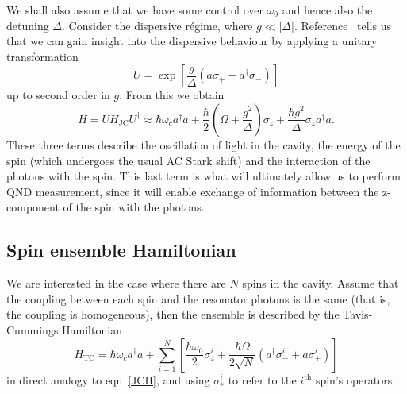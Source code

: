 \documentclass{article}
\begin{document}
We shall also assume that we have some control over $\omega_0$ and hence also
the detuning $\Delta$. Consider the dispersive r\'egime, where  $g\ll|\Delta|$.
Reference~\cite{PhysRevA.69.062320} tells us that we can gain insight into the
dispersive behaviour by applying  a unitary transformation
%
\begin{equation} U = \exp \left[\frac{g}{\Delta}(a\sigma_+ -
a^\dagger\sigma_-)\right] \end{equation}
%
up to second order in $g$.
From this we obtain
%
\begin{equation} H= UH_\text{JC}U^\dagger \approx \hbar \omega_c
  a^\dagger a + \frac{\hbar}{2}\left(\Omega +
  \frac{g^2}{\Delta}\right)\sigma_z + \frac{\hbar
  g^2}{\Delta}\sigma_z a^\dagger a.  \end{equation}
%
These three terms describe the oscillation of light in the cavity, the energy
of the spin (which undergoes the usual AC Stark shift) and the interaction of
the photons with the spin. This last term is what will ultimately allow us to
perform QND measurement, since it will enable exchange of information between
the z-component of the spin with the photons.

\subsection{Spin ensemble Hamiltonian}

We are interested in the case where there are $N$ spins in the
cavity. Assume that the coupling between each spin and the resonator photons is
the same (that is, the coupling is homogeneous), then the ensemble is described
by the Tavis-Cummings Hamiltonian~\cite{Kirton2019}
%
\begin{equation}
  H_\text{TC}=  \hbar \omega_c a^\dagger a + \sum_{i=1}^N\left[
    \frac{\hbar\omega_0}{2}\sigma_z^i +\frac{\hbar\Omega}{2\sqrt{N}}(a^\dagger
    \sigma^i_- + a\sigma^i_+)\right]
\end{equation}
%
in direct analogy to eqn~\ref{JCH}, and using $\sigma_*^i$ to refer to the
$i^\text{th}$ spin's operators.
\end{document}
